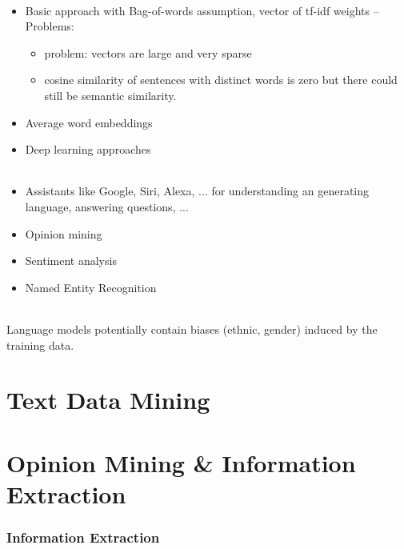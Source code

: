 \documentclass[10pt,twocolumn]{article}
\begin{document}
\paragraph{} \begin{itemize}
\item Basic approach with Bag-of-words assumption, vector of tf-idf weights -- Problems:
  \begin{itemize}
  \item problem: vectors are large and very sparse
  \item cosine similarity of sentences with distinct words is zero but there
    could still be semantic similarity.
  \end{itemize}
\item Average word embeddings
\item Deep learning approaches
\end{itemize}

\paragraph{}
\begin{itemize}
\item Assistants like Google, Siri, Alexa, ... for understanding an generating
  language, answering questions, ...
\item Opinion mining
\item Sentiment analysis
\item Named Entity Recognition
\end{itemize}

\paragraph{} Language models potentially contain biases
(ethnic, gender) induced by the training data.






\pagebreak
\part{Text Data Mining}

\pagebreak
\part{Opinion Mining \& Information Extraction}

\section{Information Extraction}
\end{document}
